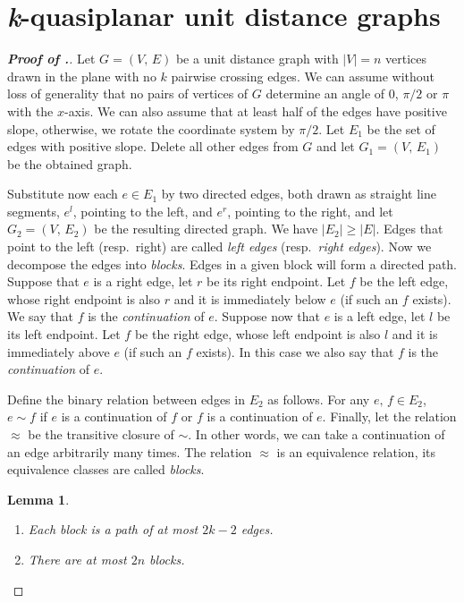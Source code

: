 \documentclass[a4paper,10pt]{article}
\newtheorem{lemma}{Lemma}
\begin{document}
\section{{\em k}-quasiplanar unit distance graphs}\label{sec4}

\begin{proof}[\bf Proof of .]
Let $G=(V, \, E)$ be a unit distance graph with $|V|=n$ vertices drawn in the plane with no $k$ pairwise crossing edges. We can assume without loss of generality that no pairs of vertices of $G$ determine an angle of $0$, $\pi/2$ or $\pi$ with the $x$-axis. We can also assume that at least half of the edges have positive slope, otherwise, we rotate the coordinate system by $\pi/2$. Let $E_1$ be the set of edges with positive slope. Delete all other edges from $G$ and let $G_1=(V, \, E_1)$ be the obtained graph.

Substitute now each $e\in E_1$ by two directed edges, both drawn as straight line segments, $e^l$, pointing to the left, and $e^r$, pointing to the right, and let $G_2=(V, \, E_2)$ be the resulting directed graph. We have $|E_2|\ge |E|$. Edges that point to the left (resp.\ right) are called {\em left edges} (resp.\ {\em right edges}). Now we decompose the edges into {\em blocks}. Edges in a given block will form a directed path. Suppose that $e$ is a right edge, let $r$ be its right endpoint. Let $f$ be the left edge, whose right endpoint is also $r$ and it is immediately below $e$ (if such an $f$ exists). We say that $f$ is the {\em continuation} of $e$. Suppose now that $e$ is a left edge, let $l$ be its left endpoint. Let $f$ be the right edge, whose left endpoint is also $l$ and it is immediately above $e$ (if such an $f$ exists). In this case we also say that $f$ is the {\em continuation} of $e$.

Define the binary relation between edges in $E_2$ as follows.
For any $e, \, f\in E_2$, $e\sim f$ if $e$ is a continuation of $f$ or $f$ is a continuation of $e$. Finally, let the relation $\approx$ be the transitive closure of $\sim$. In other words, we can take a continuation of an edge arbitrarily many times. The relation $\approx$ is an equivalence relation, its equivalence classes are called {\em blocks}.

\smallskip

\begin{lemma} \mbox{}

\begin{enumerate}[label=(\roman*)] 
    \item Each block is a path of at most $2k-2$ edges.
    \item There are at most $2n$ blocks.
\end{enumerate}
\end{lemma}


\end{proof}
\end{document}
